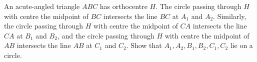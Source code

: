 An acute-angled triangle $ABC$ has orthocentre $H$. The circle passing through $H$ with centre the midpoint of $BC$ intersects the line $BC$ at $A_1$ and $A_2$. Similarly, the circle passing through $H$ with centre the midpoint of $CA$ intersects the line $CA$ at $B_1$ and $B_2$, and the circle passing through $H$ with centre the midpoint of $AB$ intersects the line $AB$ at $C_1$ and $C_2$. Show that $A_1,A_2,B_1,B_2,C_1,C_2$ lie on a circle.